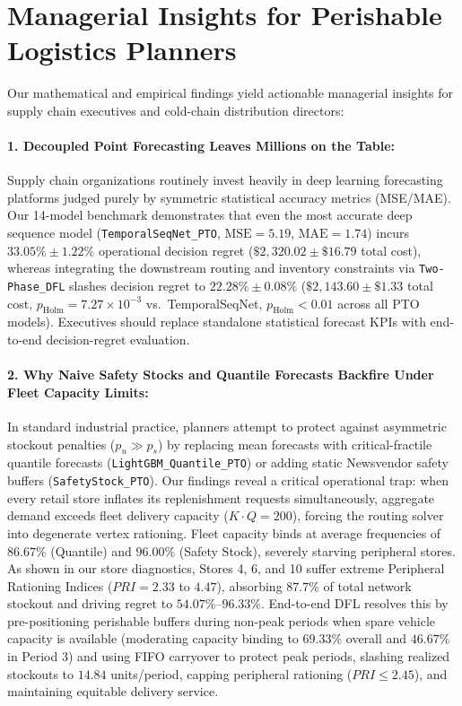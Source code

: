 \documentclass[11pt,a4paper]{article}
\theoremstyle{definition}
\theoremstyle{remark}
\begin{document}
\FloatBarrier
\section{Managerial Insights for Perishable Logistics Planners}
\label{sec:managerial_insights}

Our mathematical and empirical findings yield actionable managerial insights for supply chain executives and cold-chain distribution directors:

\paragraph{1. Decoupled Point Forecasting Leaves Millions on the Table:}
Supply chain organizations routinely invest heavily in deep learning forecasting platforms judged purely by symmetric statistical accuracy metrics (MSE/MAE). Our 14-model benchmark demonstrates that even the most accurate deep sequence model (\texttt{TemporalSeqNet\_PTO}, $\text{MSE} = 5.19$, $\text{MAE} = 1.74$) incurs $33.05\% \pm 1.22\%$ operational decision regret ($\$2,320.02 \pm \$16.79$ total cost), whereas integrating the downstream routing and inventory constraints via \texttt{Two-Phase\_DFL} slashes decision regret to $22.28\% \pm 0.08\%$ ($\$2,143.60 \pm \$1.33$ total cost, $p_{\text{Holm}} = 7.27 \times 10^{-3}$ vs.\ TemporalSeqNet, $p_{\text{Holm}} < 0.01$ across all PTO models). Executives should replace standalone statistical forecast KPIs with end-to-end decision-regret evaluation.

\paragraph{2. Why Naive Safety Stocks and Quantile Forecasts Backfire Under Fleet Capacity Limits:}
In standard industrial practice, planners attempt to protect against asymmetric stockout penalties ($p_u \gg p_s$) by replacing mean forecasts with critical-fractile quantile forecasts (\texttt{LightGBM\_Quantile\_PTO}) or adding static Newsvendor safety buffers (\texttt{SafetyStock\_PTO}). Our findings reveal a critical operational trap: when every retail store inflates its replenishment requests simultaneously, aggregate demand exceeds fleet delivery capacity ($K \cdot Q = 200$), forcing the routing solver into degenerate vertex rationing. Fleet capacity binds at average frequencies of $86.67\%$ (Quantile) and $96.00\%$ (Safety Stock), severely starving peripheral stores. As shown in our store diagnostics, Stores 4, 6, and 10 suffer extreme Peripheral Rationing Indices ($PRI = 2.33$ to $4.47$), absorbing $87.7\%$ of total network stockout and driving regret to $54.07\%$--$96.33\%$. End-to-end DFL resolves this by pre-positioning perishable buffers during non-peak periods when spare vehicle capacity is available (moderating capacity binding to $69.33\%$ overall and $46.67\%$ in Period 3) and using FIFO carryover to protect peak periods, slashing realized stockouts to $14.84$ units/period, capping peripheral rationing ($PRI \le 2.45$), and maintaining equitable delivery service.
\end{document}
